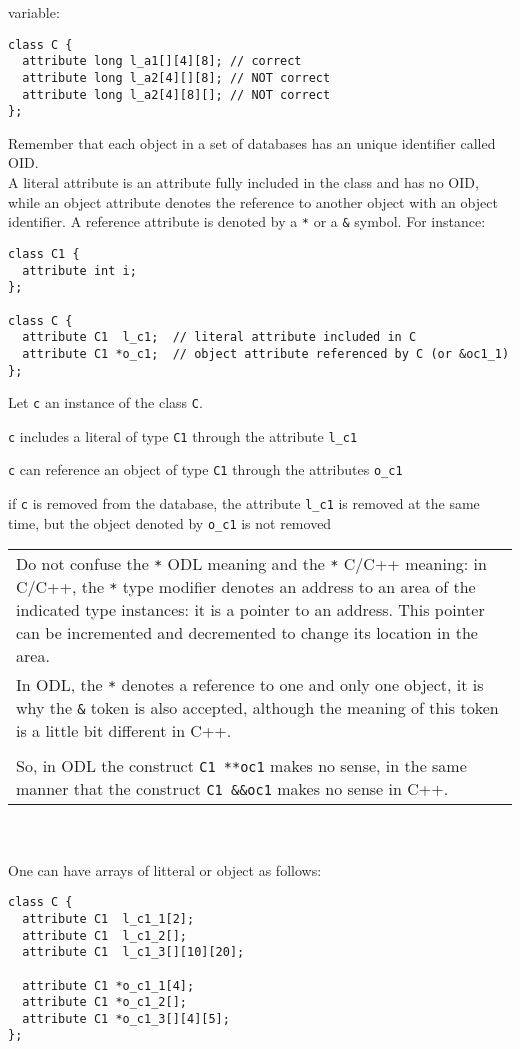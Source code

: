 variable:
\vspace{-0.2cm}
\begin{verbatim}
class C {
  attribute long l_a1[][4][8]; // correct
  attribute long l_a2[4][][8]; // NOT correct
  attribute long l_a2[4][8][]; // NOT correct
};
\end{verbatim}
Remember that each object in a set of \eyedb databases has an unique identifier called OID.
\\
A literal attribute is an attribute fully included in the class and has
no OID, while an object attribute denotes the reference
to another object with an object identifier.
A reference attribute is denoted by a \texttt{*} or a \texttt{\&} symbol.
For instance:
\vspace{-0.2cm}
\begin{verbatim}
class C1 {
  attribute int i;
};

class C {
  attribute C1  l_c1;  // literal attribute included in C
  attribute C1 *o_c1;  // object attribute referenced by C (or &oc1_1)
};
\end{verbatim}
Let \texttt{c} an instance of the class \texttt{C}.
\bi
\item \texttt{c} includes a literal of type \texttt{C1} through the attribute
\texttt{l\_c1}
\item \texttt{c} can reference an object of type \texttt{C1} through the attributes 
\texttt{o\_c1}
\item if \texttt{c} is removed from the database, the attribute \texttt{l\_c1}
is removed at the same time, but the object denoted by \texttt{o\_c1} is
not removed
\ei
\begin{tabular}{|p{16.8cm}|}
\hline
\vspace{0.1mm}
Do not confuse the \texttt{*} ODL meaning and the \texttt{*} C/C++ meaning:
in C/C++, the \texttt{*} type modifier denotes an address to an area of the
indicated type instances: it is a pointer to an address. This pointer
can be incremented and decremented to change its location in the area.
\\
In ODL, the \texttt{*} denotes a reference to one and only one object, it is why
the \texttt{\&} token is also accepted, although the meaning of this token
is a little bit different in C++.
\\
\\
So, in ODL the construct \texttt{C1 **oc1} makes no sense, in the same
manner that the construct \texttt{C1 \&\&oc1} makes no sense in C++.\\
\hline
\end{tabular}\\
\\
One can have arrays of litteral or object as follows:
\vspace{-0.2cm}
\begin{verbatim}
class C {
  attribute C1  l_c1_1[2];
  attribute C1  l_c1_2[];
  attribute C1  l_c1_3[][10][20];

  attribute C1 *o_c1_1[4];
  attribute C1 *o_c1_2[];
  attribute C1 *o_c1_3[][4][5];
};
\end{verbatim}

